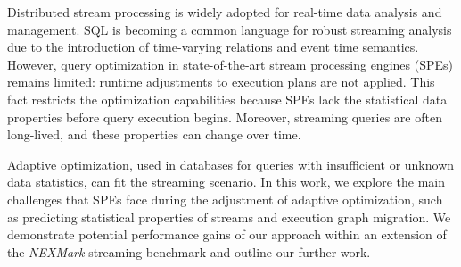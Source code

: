 Distributed stream processing is widely adopted for real-time data analysis and management. SQL is becoming a common language for robust streaming analysis due to the introduction of time-varying relations and event time semantics. 
However, query optimization in state-of-the-art stream processing engines (SPEs) remains limited: runtime adjustments to execution plans are not applied. 
This fact restricts the optimization capabilities because SPEs lack the statistical data properties before query execution begins. Moreover, streaming queries are often long-lived, and these properties can change over time. 

Adaptive optimization, used in databases for queries with insufficient or unknown data statistics, can fit the streaming scenario. 
In this work, we explore the main challenges that SPEs face during the adjustment of adaptive optimization, such as predicting statistical properties of streams and execution graph migration.
We demonstrate potential performance gains of our approach within an extension of the {\em NEXMark} streaming benchmark and outline our further work.

